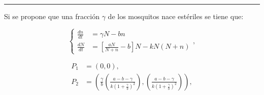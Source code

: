 \documentclass[twocolumn,aps,prl]{revtex4-1}
\newcommand*\sepline{%
  \begin{center}
    \rule[1ex]{.5\textwidth}{.5pt}
  \end{center}}
\newcommand{\tusa}{ \frac{a-b-\gamma}{k(1+\frac{\gamma}{b})^2} }
\begin{document}

\sepline

Si se propone que una fracción $\gamma$ de los mosquitos nace estériles se tiene que:

\begin{equation}
    \left\lbrace
    \begin{aligned}
        \frac{d n}{d t}&=  \gamma N - b n
        \\
        \frac{d N}{d t}&=\left[\frac{a N}{N+n}-b\right] N- k N(N+n) 
    \end{aligned}
    \right. ,
\end{equation}


$$
\begin{aligned}
    P_1 &= (0, 0) ,\\
    P_2 &= \left( \frac{\gamma}{b} \left( \tusa \right), \left( \tusa \right) \right), \\ 
\end{aligned}
$$





\end{document}
